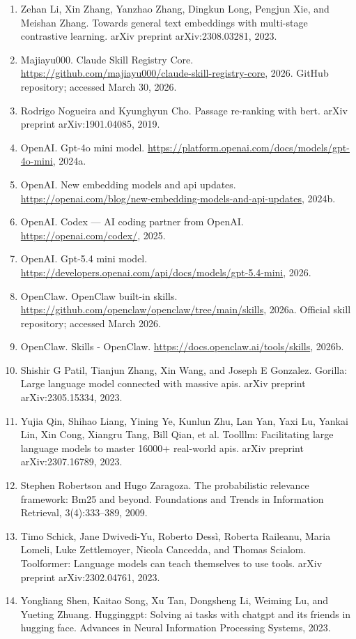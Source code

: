 \documentclass[11pt,UTF8,fontset=fandol]{ctexart}
\begin{document}
\begin{enumerate}[leftmargin=2em,itemsep=0.2em]
\item Zehan Li, Xin Zhang, Yanzhao Zhang, Dingkun Long, Pengjun Xie, and Meishan Zhang. Towards general text embeddings with multi-stage contrastive learning. arXiv preprint arXiv:2308.03281, 2023.
\item Majiayu000. Claude Skill Registry Core. \url{https://github.com/majiayu000/claude-skill-registry-core}, 2026. GitHub repository; accessed March 30, 2026.
\item Rodrigo Nogueira and Kyunghyun Cho. Passage re-ranking with bert. arXiv preprint arXiv:1901.04085, 2019.
\item OpenAI. Gpt-4o mini model. \url{https://platform.openai.com/docs/models/gpt-4o-mini}, 2024a.
\item OpenAI. New embedding models and api updates. \url{https://openai.com/blog/new-embedding-models-and-api-updates}, 2024b.
\item OpenAI. Codex --- AI coding partner from OpenAI. \url{https://openai.com/codex/}, 2025.
\item OpenAI. Gpt-5.4 mini model. \url{https://developers.openai.com/api/docs/models/gpt-5.4-mini}, 2026.
\item OpenClaw. OpenClaw built-in skills. \url{https://github.com/openclaw/openclaw/tree/main/skills}, 2026a. Official skill repository; accessed March 2026.
\item OpenClaw. Skills - OpenClaw. \url{https://docs.openclaw.ai/tools/skills}, 2026b.
\item Shishir G Patil, Tianjun Zhang, Xin Wang, and Joseph E Gonzalez. Gorilla: Large language model connected with massive apis. arXiv preprint arXiv:2305.15334, 2023.
\item Yujia Qin, Shihao Liang, Yining Ye, Kunlun Zhu, Lan Yan, Yaxi Lu, Yankai Lin, Xin Cong, Xiangru Tang, Bill Qian, et al. Toolllm: Facilitating large language models to master 16000+ real-world apis. arXiv preprint arXiv:2307.16789, 2023.
\item Stephen Robertson and Hugo Zaragoza. The probabilistic relevance framework: Bm25 and beyond. Foundations and Trends in Information Retrieval, 3(4):333--389, 2009.
\item Timo Schick, Jane Dwivedi-Yu, Roberto Dess\`i, Roberta Raileanu, Maria Lomeli, Luke Zettlemoyer, Nicola Cancedda, and Thomas Scialom. Toolformer: Language models can teach themselves to use tools. arXiv preprint arXiv:2302.04761, 2023.
\item Yongliang Shen, Kaitao Song, Xu Tan, Dongsheng Li, Weiming Lu, and Yueting Zhuang. Hugginggpt: Solving ai tasks with chatgpt and its friends in hugging face. Advances in Neural Information Processing Systems, 2023.

\end{enumerate}
\end{document}
